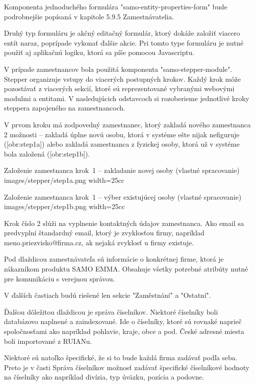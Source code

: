 Komponenta jednoduchého formulára "samo-entity-properties-form" bude podrobnejšie popísaná v kapitole 5.9.5 Zamestnávatelia.

Druhý typ formuláru je akčný editačný formulár, ktorý dokáže založiť viacero entít naraz, poprípade vykonať ďalšie akcie. Pri tomto type formuláru je nutné použiť aj aplikačnú logiku, ktorá sa píše pomocou Javascriptu. 

V prípade zamestnancov bola použitá komponenta "samo-stepper-module". Stepper organizuje vstupy do viacerých postupných krokov. Každý krok môže pozostávať z viacerých sekcií, ktoré sú reprezentované vybranými webovými modulmi a entitami. V nasledujúcich odstavcoch si rozoberieme jednotlivé kroky steppera zapojeného na zamestnancoch.

V prvom kroku má zodpovedný zamestnanec, ktorý zakladá nového zamestnanca 2 možnosti -- zakladá úplne novú osobu, ktorá v systéme ešte nijak nefiguruje ([obr:step1a]) alebo zakladá zamestnanca z  fyzickej osoby, ktorá už v systéme bola založená ([obr:step1b]).

{Založenie zamestnanca krok~1 -- zakladanie novej osoby (vlastné spracovanie)}
{images/stepper/step1a.png}
{width=25cc} 

{Založenie zamestnanca krok~1 -- výber existujúcej osoby (vlastné spracovanie)}
{images/stepper/step1b.png}
{width=25cc} 

Krok číslo 2 slúži na vyplnenie kontaktných údajov zamestnanca. Ako email sa predvyplní štandardný email, ktorý je zvyklosťou firmy, napríklad meno.priezvisko@firma.cz, ak nejaká zvyklosť u firmy existuje.


Pod dlaždicou zamestnávateľa sú informácie o konkrétnej firme, ktorá je zákazníkom produktu SAMO EMMA. Obsahuje všetky potrebné atribúty nutné pre komunikáciu s verejnou správou.

V ďalších častiach budú riešené len sekcie "Zaměstnání" a "Ostatní". 

Ďalšou dôležitou dlaždicou je správa číselníkov. Niektoré číselníky boli databázovo naplnené a zaindexované. Ide o číselníky, ktoré sú rovnaké naprieč spoločnosťami ako napríklad pohlavie, kraje, obce a pod. České adresné miesta boli importované z RUIANu.

Niektoré sú natoľko špecifické, že si to bude každá firma zadávať podľa seba. Preto je v časti Správa číselníkov možnosť zadávať špecifické číselníkové hodnoty na číselníky ako napríklad divízia, typ úväzku, pozícia a podovne.

